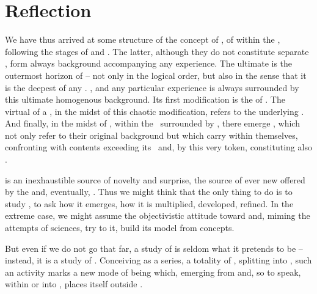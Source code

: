 %
\section{Reflection}\label{se:reflection}

\pa We have thus arrived at some structure of the concept of
, of 
 within the \hoa, following the stages of
 and .  The latter, although they do not
constitute separate , form always  background accompanying
any experience.
The ultimate  is the outermost horizon of  -- not
only in the logical order, but also in the sense that it is the deepest  of
any .  , and any particular experience is always
surrounded by this ultimate homogenous background.  Its first modification is
the  of .  The virtual  of a
, in the midst of this chaotic modification, refers to the
underlying .  And finally, in the midst of ,
within the \hoa\ surrounded by , there emerge
,  which not only refer to their original background
but which carry  within themselves, confronting 
with contents exceeding its \hoa\ and, by this very token, constituting also
.


\pa {} is an inexhaustible source of novelty and surprise, the
source of ever new  offered by the  and, eventually,
. Thus we might think that the only thing to do is to study
, to ask how it emerges, how it is multiplied, developed,
refined. In the extreme case, we might assume the {objectivistic attitude}
toward  and, miming the attempts of sciences, try to
 it, build its model from  concepts.


But even if we do not go that far, a study of  is seldom what it
pretends to be -- instead, it is a study of .  Conceiving
 as a series, a totality of , splitting
 into  , such an activity marks a
new mode of being which, emerging from and, so to speak, within or into
, places itself outside .

